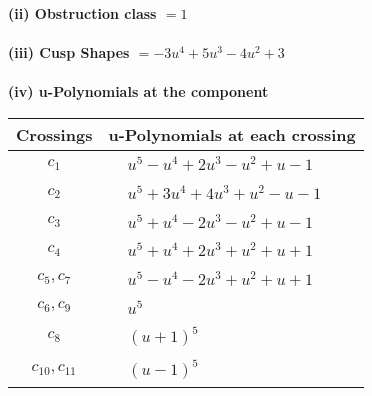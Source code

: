 \documentclass[1p]{elsarticle_modified}
\theoremstyle{definition}
\begin{document}
\flushleft \textbf{(ii) Obstruction class $= 1$}\\~\\
\flushleft \textbf{(iii) Cusp Shapes $= -3 u^4+5 u^3-4 u^2+3$}\\~\\
\newpage\renewcommand{\arraystretch}{1}
\flushleft \textbf{(iv) u-Polynomials at the component}\newline \\
\begin{tabular}{m{50pt}|m{274pt}}
Crossings & \hspace{64pt}u-Polynomials at each crossing \\
\hline $$\begin{aligned}c_{1}\end{aligned}$$&$\begin{aligned}
&u^5- u^4+2 u^3- u^2+u-1
\end{aligned}$\\
\hline $$\begin{aligned}c_{2}\end{aligned}$$&$\begin{aligned}
&u^5+3 u^4+4 u^3+u^2- u-1
\end{aligned}$\\
\hline $$\begin{aligned}c_{3}\end{aligned}$$&$\begin{aligned}
&u^5+u^4-2 u^3- u^2+u-1
\end{aligned}$\\
\hline $$\begin{aligned}c_{4}\end{aligned}$$&$\begin{aligned}
&u^5+u^4+2 u^3+u^2+u+1
\end{aligned}$\\
\hline $$\begin{aligned}c_{5},c_{7}\end{aligned}$$&$\begin{aligned}
&u^5- u^4-2 u^3+u^2+u+1
\end{aligned}$\\
\hline $$\begin{aligned}c_{6},c_{9}\end{aligned}$$&$\begin{aligned}
&u^5
\end{aligned}$\\
\hline $$\begin{aligned}c_{8}\end{aligned}$$&$\begin{aligned}
&(u+1)^5
\end{aligned}$\\
\hline $$\begin{aligned}c_{10},c_{11}\end{aligned}$$&$\begin{aligned}
&(u-1)^5
\end{aligned}$\\
\hline
\end{tabular}\\~\\
\end{document}
